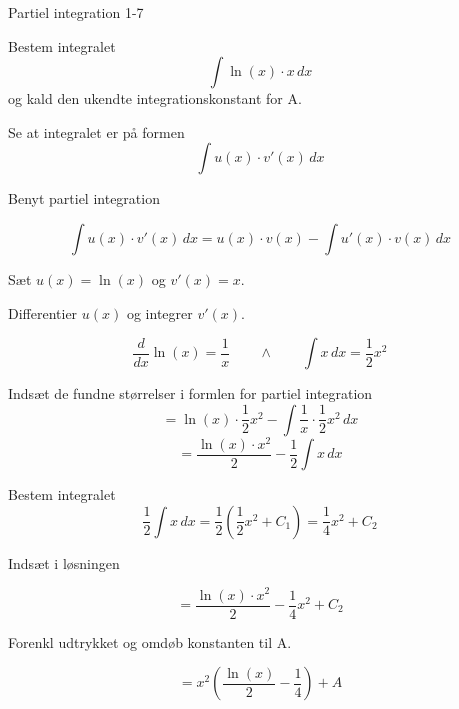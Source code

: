 \documentclass{article}
\begin{document}
\begin{exercise}{Partiel integration 1-7}


Bestem integralet
\[
\int \ln(x) \cdot x \, dx
\]
og kald den ukendte integrationskonstant for A.



\hint

Se at integralet er på formen
\[
\int u(x) \cdot v'(x) \, dx
\]

\hint

Benyt partiel integration

\hint
\[
\int u(x) \cdot v'(x)\, dx = u(x) \cdot v(x) - \int u'(x) \cdot v(x) \, dx
\]
\hint

Sæt $u(x) = \ln(x)$ og $v'(x) = x$.


\hint

Differentier $u(x)$ og integrer $v'(x)$.

\hint
\[
\frac{d}{dx}\ln(x) = \frac{1}{x} \qquad \wedge \qquad \int x \, dx = \frac{1 }{2}x^2
\]

\hint

Indsæt de fundne størrelser i formlen for partiel integration
\[
= \ln(x) \cdot \frac{1}{2}x^2 - \int \frac{1}{x} \cdot \frac{1}{2}x^2 \, dx
\]
\[
= \frac{\ln(x) \cdot x^2}{2} - \frac{1}{2}\int x \, dx
\]

\hint

Bestem integralet
\[
\frac{1}{2}\int x \, dx = \frac{1}{2} \left( \frac{1}{2}x^2 + C_1 \right) = \frac{1}{4}x^2 + C_2
\]

\hint
Indsæt i løsningen

\hint

\[
= \frac{\ln(x) \cdot x^2}{2} - \frac{1}{4}x^2 + C_2
\]

\hint

Forenkl udtrykket og omdøb konstanten til A.

\hint

\[
= x^2 \left( \frac{\ln(x)}{2} - \frac{1}{4} \right) + A
\]


\end{exercise}

\newpage
\end{document}
